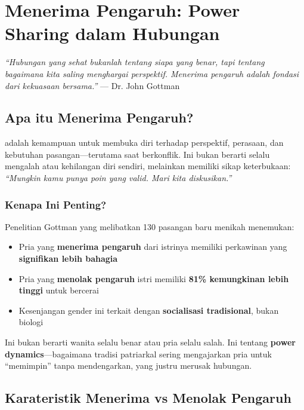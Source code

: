 \chapter{Menerima Pengaruh: Power Sharing dalam Hubungan}

\begin{insightbox}
\textit{``Hubungan yang sehat bukanlah tentang siapa yang benar, tapi tentang bagaimana kita saling menghargai perspektif. Menerima pengaruh adalah fondasi dari kekuasaan bersama.''} — Dr. John Gottman
\end{insightbox}

\section{Apa itu Menerima Pengaruh?}

 adalah kemampuan untuk membuka diri terhadap perspektif, perasaan, dan kebutuhan pasangan---terutama saat berkonflik. Ini bukan berarti selalu mengalah atau kehilangan diri sendiri, melainkan memiliki sikap keterbukaan: \textit{``Mungkin kamu punya poin yang valid. Mari kita diskusikan.''}

\subsection{Kenapa Ini Penting?}

Penelitian Gottman yang melibatkan 130 pasangan baru menikah menemukan:

\begin{praktikbox}
\begin{itemize}
    \item Pria yang \textbf{menerima pengaruh} dari istrinya memiliki perkawinan yang \textbf{signifikan lebih bahagia}
    \item Pria yang \textbf{menolak pengaruh} istri memiliki \textbf{81\% kemungkinan lebih tinggi} untuk bercerai
    \item Kesenjangan gender ini terkait dengan \textbf{socialisasi tradisional}, bukan biologi
\end{itemize}
\end{praktikbox}

Ini bukan berarti wanita selalu benar atau pria selalu salah. Ini tentang \textbf{power dynamics}---bagaimana tradisi patriarkal sering mengajarkan pria untuk ``memimpin'' tanpa mendengarkan, yang justru merusak hubungan.

\section{Karateristik Menerima vs Menolak Pengaruh}

